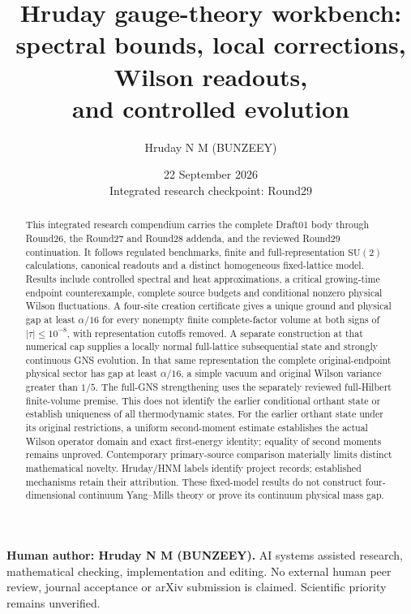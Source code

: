 \documentclass[11pt,a4paper]{article}
\title{Hruday gauge-theory workbench:\\spectral bounds, local corrections, Wilson readouts,\\and controlled evolution}
\author{Hruday N M (BUNZEEY)}
\date{22 September 2026\\\small Integrated research checkpoint: Round29}
\theoremstyle{definition}\newtheorem{definition}[theorem]{Definition}
\theoremstyle{remark}\newtheorem{remark}[theorem]{Remark}
\begin{document}
\maketitle
\begin{abstract}
This integrated research compendium carries the complete Draft01 body through Round26, the Round27 and Round28 addenda, and the reviewed Round29 continuation. It follows regulated benchmarks, finite and full-representation $\mathrm{SU}(2)$ calculations, canonical readouts and a distinct homogeneous fixed-lattice model. Results include controlled spectral and heat approximations, a critical growing-time endpoint counterexample, complete source budgets and conditional nonzero physical Wilson fluctuations. A four-site creation certificate gives a unique ground and physical gap at least $\alpha/16$ for every nonempty finite complete-factor volume at both signs of $|\tau|\le10^{-8}$, with representation cutoffs removed. A separate construction at that numerical cap supplies a locally normal full-lattice subsequential state and strongly continuous GNS evolution. In that same representation the complete original-endpoint physical sector has gap at least $\alpha/16$, a simple vacuum and original Wilson variance greater than $1/5$. The full-GNS strengthening uses the separately reviewed full-Hilbert finite-volume premise. This does not identify the earlier conditional orthant state or establish uniqueness of all thermodynamic states. For the earlier orthant state under its original restrictions, a uniform second-moment estimate establishes the actual Wilson operator domain and exact first-energy identity; equality of second moments remains unproved. Contemporary primary-source comparison materially limits distinct mathematical novelty. Hruday/HNM labels identify project records; established mechanisms retain their attribution. These fixed-model results do not construct four-dimensional continuum Yang--Mills theory or prove its continuum physical mass gap.
\end{abstract}
\begin{center}\small\textbf{Human author: Hruday N M (BUNZEEY).} AI systems assisted research, mathematical checking, implementation and editing. No external human peer review, journal acceptance or arXiv submission is claimed. Scientific priority remains unverified.\end{center}
\clearpage
\tableofcontents
\clearpage






\end{document}

